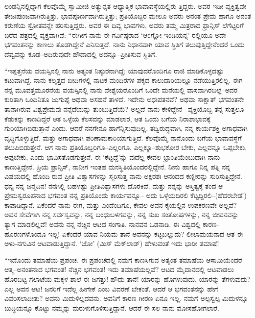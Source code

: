 ಲಂಡನ್ನಿನಲ್ಲಿದ್ದಾಗ ಕೆಲವೊಮ್ಮೆ ಸ್ವಾಮೀಜಿ ಅತ್ಯುನ್ನತ ಆಧ್ಯಾತ್ಮಿಕ ಭಾವಾವಸ್ಥೆಯಲ್ಲಿರು ತ್ತಿದ್ದರು. ಅವರ ಇಡೀ ವ್ಯಕ್ತಿತ್ವವೇ ತೇಜಃಪುಂಜವಾಗಿರುತ್ತಿತ್ತು, ಭಾವಪೂರ್ಣವಾಗಿರುತ್ತಿತ್ತು; ಪ್ರತಿಯೊಬ್ಬರ ಮೇಲೂ ಅವರು ಅನಂತ ಪ್ರೇಮ ಹಾಗೂ ಅನಂತ ಕರುಣೆಯ ಸ್ರೋತವನ್ನೇ ಹರಿಸುತ್ತಿದ್ದರು. ಅವರ ಈ ದಿವ್ಯ ಭಾವಗಳು, ಅವರು ತಮ್ಮ ಮಿತ್ರರಾದ ಫ್ರಾನ್ಸಿಸ್ ಲೆಗೆಟ್ಟರಿಗೆ ಬರೆದ ಪತ್ರದಲ್ಲಿ ವ್ಯಕ್ತವಾಗಿವೆ: “ಈಗೀಗ ನಾನು ಈ ಗರ್ವಿಷ್ಠರಾದ ‘ಆಂಗ್ಲೋ ಇಂಡಿಯನ್ನ’ ರಲ್ಲಿಯೂ ಅದೇ ಭಗವಂತನನ್ನು ಕಾಣಲು ತೊಡಗಿದ್ದೇನೆ ಎನಿಸುತ್ತದೆ. ನಾನು ನಿಧಾನವಾಗಿ ಯಾವ ಸ್ಥಿತಿಗೆ ತಲುಪುತ್ತಿದ್ದೇನೆಂದರೆ ಒಂದು ದೆವ್ವವನ್ನು ಕೂಡ–ಅದಿರುವುದೇ ಹೌದಾದಲ್ಲಿ ಅದನ್ನೂ–ಪ್ರೀತಿಸುವ ಸ್ಥಿತಿಗೆ.

“ಇಪ್ಪತ್ತನೆಯ ವಯಸ್ಸಿನಲ್ಲಿ ನಾನು ಅತ್ಯಂತ ನಿಷ್ಠುರನಾಗಿದ್ದೆ; ಯಾವುದರೊಂದಿಗೂ ರಾಜಿ ಮಾಡಿಕೊಳ್ಳದಷ್ಟು ಕಟುವಾಗಿದ್ದೆ. ನಾನು ಕಲ್ಕತ್ತದ ಬೀದಿಗಳಲ್ಲಿ ನಾಟಕ ಮಂದಿರಗಳ ಪಕ್ಕದ ಕಾಲುದಾರಿಯಲ್ಲೂ ನಡೆಯುತ್ತಿರಲಿಲ್ಲ. ಈಗ ನನ್ನ ಮೂವತ್ತಮೂರನೆಯ ವಯಸ್ಸಿನಲ್ಲಿ ನಾನು ವೇಶ್ಯೆಯರೊಂದಿಗೆ ಒಂದೇ ಮನೆಯಲ್ಲಿ ವಾಸವಾಗಿರಬಲ್ಲೆ–ಅವರ ಕುರಿತಾಗಿ ಒಂದಿನಿತೂ ಜುಗುಪ್ಸೆ ಅಥವಾ ಅಸಹನೆ ತಾಳದೆ. ಇದೇನು ಅಧಃಪತನವೆ? ಅಥವಾ ಸಾಕ್ಷಾತ್ ಭಗವಂತನೇ ತಾನಾಗಿರುವ ವಿಶ್ವಪ್ರೇಮವು ನನ್ನೆದೆಯನ್ನು ತುಂಬುತ್ತಿದೆಯೆ? ಅಲ್ಲದೆ ನಾನು ಕೇಳಿದ್ದೇನೆ –ವ್ಯಕ್ತಿಯೊಬ್ಬ ತನ್ನ ಸುತ್ತಲೂ ಕೆಡುಕನ್ನು ಕಾಣದಿದ್ದರೆ ಆತ ಒಳ್ಳೆಯ ಕೆಲಸವನ್ನು ಮಾಡಲಾರ, ಆತ ಒಂದು ಬಗೆಯ ನಿರಾಶಾಭಾವಕ್ಕೆ ಗುರಿಯಾಗಿಬಿಡುತ್ತಾನೆ ಎಂದು. ಆದರೆ ನನಗೇನೂ ಹಾಗೆನ್ನಿಸುವುದಿಲ್ಲ. ತದ್ವಿರುದ್ಧವಾಗಿ, ನನ್ನ ಕಾರ್ಯಶಕ್ತಿ ಅಗಾಧವಾಗಿ ವೃದ್ಧಿಗೊಳ್ಳುತ್ತಿದೆ. ಮತ್ತು ಅಗಾಧವಾಗಿ ಪರಿಣಾಮಕಾರಿಯಾಗುತ್ತಿದೆ. ಕೆಲವೊಮ್ಮೆ ನಾನೊಂದು ಬಗೆಯ ಭಾವಾವಸ್ಥೆಗೆ ತಲುಪಿಬಿಡುತ್ತೇನೆ. ಆಗ ನಾನು ಪ್ರತಿಯೊಬ್ಬರಿಗೂ–ಎಲ್ಲರಿಗೂ, ಎಲ್ಲಕ್ಕೂ–ಶುಭಕೋರ ಬೇಕು, ಎಲ್ಲವನ್ನೂ ಒಪ್ಪಬೇಕು, ಅಪ್ಪಬೇಕು, ಎಂದು ಭಾವಿಸತೊಡಗುತ್ತೇನೆ. ಈ ‘ಕೆಟ್ಟದ್ದೆ’ನ್ನು ವುದೆಲ್ಲ ಕೇವಲ ಭ್ರಾಂತಿಯೆಂಬುದಾಗಿ ನಾನು ಕಾಣುತ್ತಿದ್ದೇನೆ. ಪ್ರಿಯ ಫ್ರಾನ್ಸಿಸ್, ನಾನೀಗ ಇಂತಹ ಮನಸ್ಥಿತಿಯೊಂದರಲ್ಲಿದ್ದೇನೆ. ನೀನು ಹಾಗೂ ನಿನ್ನ ಪತ್ನಿ ನನ್ನ ವಿಷಯದಲ್ಲಿ ಹೊಂದಿ ರುವ ಪ್ರೀತಿ ವಿಶ್ವಾಸಗಳನ್ನು ಸ್ಮರಿಸುತ್ತ ನಾನು ಅಕ್ಷರಶಃ ಆನಂದದ ಕಣ್ಣೀರನ್ನು ಸುರಿಸುತ್ತಿದ್ದೇನೆ. ಧನ್ಯ ನನ್ನ ಜನ್ಮದಿನ! ನನಗಿಲ್ಲಿ ಬಹಳಷ್ಟು ಪ್ರೀತಿವಿಶ್ವಾಸಗಳು ದೊರಕಿವೆ. ಮತ್ತು ನನ್ನನ್ನು ಅಸ್ತಿತ್ವಕ್ಕೆ ತಂದ ಆ ಪ್ರೇಮಸ್ವರೂಪನಾದ ಭಗವಂತ ನನ್ನ ಪ್ರತಿಯೊಂದು ಕಾರ್ಯವನ್ನೂ– ಅದು ಒಳ್ಳೆಯದಿರಲಿ ಕೆಟ್ಟದ್ದಿರಲಿ–(ಹೆದರಬೇಡ!) ಕಾಪಾಡಿದ್ದಾನೆ. ಏಕೆಂದರೆ ನಾನು ಈಗ, ಮತ್ತು ಎಂದೆಂದಿಗೂ, ಕೇವಲ ಅವನ ಕೈಯಲ್ಲಿನ ಉಪಕರಣವೇ ಅಲ್ಲವೆ? ಅವನ ಸೇವೆಗಾಗಿ ನನ್ನ ಸರ್ವಸ್ವವನ್ನು, ನನ್ನ ಬಂಧುಬಳಗವನ್ನು, ನನ್ನ ಸುಖ ಸಂತೋಷಗಳನ್ನು, ನನ್ನ ಜೀವನವನ್ನು ತ್ಯಾಗ ಮಾಡಲಿಲ್ಲವೆ! ಅವನು ನನ್ನ ನೆಚ್ಚಿನ ಆಟದ ಸಂಗಾತಿ, ನಾನವನ ಒಡನಾಡಿ. ಈ ವಿಶ್ವದಲ್ಲಿ ಕಾರಣ-ಹೂರಣಗಳೊಂದೂ ಇಲ್ಲ! ಏಕೆಂದರೆ ಯಾವ ನಿಯಮ ತಾನೆ ಅವನನ್ನು ಕಟ್ಟಬಲ್ಲುದು? ಲೀಲಾಮಯನಾದ ಆತ ಈ ಅಳು-ನಗುವಿನ ಆಟವಾಡುತ್ತಿದ್ದಾನೆ. ‘ಜೋ’ (ಮಿಸ್ ಮೆಕ್​ಲಾಡ್​) ಹೇಳುವಂತೆ ಇದು ಭಾರೀ ತಮಾಷೆ!

“ಇದೊಂದು ತಮಾಷೆಯ ಪ್ರಪಂಚ. ಈ ಪ್ರಪಂಚದಲ್ಲಿ ನಮಗೆ ಕಾಣಸಿಗುವ ಅತ್ಯಂತ ತಮಾಷೆಯ ಆಸಾಮಿಯೆಂದರೆ ಆತ್ಮ–ಅನಂತನಾದ ಭಗವಂತ! ನೆಚ್ಚಿನ ಭಗವಂತ! ಇದು ತಮಾಷೆಯಲ್ಲವೆ? ಆಟದ ಮೈದಾನದಲ್ಲಿ ಆಟವಾಡಲು ಹೊರಬಿಟ್ಟ ಗಲಾಟೆಯ ಮಕ್ಕಳ ಶಾಲೆ ಈ ಜಗತ್ತು! ಹೌದು ತಾನೆ! ಯಾರನ್ನು ಹೊಗಳುವುದು, ಯಾರನ್ನು ತೆಗಳುವುದು? ಎಲ್ಲ ಅವನ ಆಟ! ಜನರಿಗೆ ಇದೆಲ್ಲ ಹೀಗೇಕೆ ಎಂಬ ವಿವರಣೆ ಬೇಕಂತೆ. ಆದರೆ ಆ ಭಗವಂತನನ್ನು ಹೇಗೆ ವಿವರಿಸಲಾದೀತು? ಅವನು ಮಿದುಳಿಲ್ಲದವನು. ಅವನಿಗೆ ಕಾರಣ ಗೀರಣ ಏನೂ ಇಲ್ಲ. ನಮಗೆ ಅಲ್ಪಸ್ವಲ್ಪ ಮಿದುಳನ್ನೂ ಬುದ್ಧಿಯನ್ನೂ ಕೊಟ್ಟು ನಮ್ಮನ್ನು ಮರುಳುಗೊಳಿಸುತ್ತಿದ್ದಾನೆ. ಆದರೆ ಈ ಸಲ ನಾನು ಮೋಸಹೋಗಲಾರೆ.

